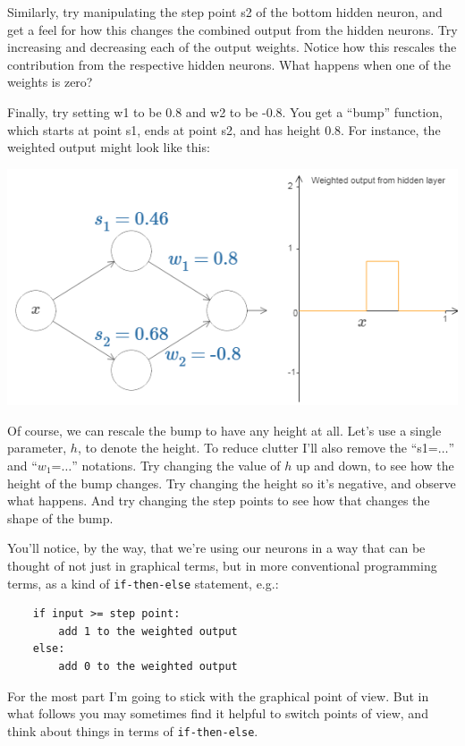 Similarly, try manipulating the step point s2 of the bottom hidden neuron, and get a feel for how this changes the combined output from the hidden neurons.
Try increasing and decreasing each of the output weights. Notice how this rescales the contribution from the respective hidden neurons. What happens when one of the weights is zero?

Finally, try setting w1 to be 0.8 and w2 to be -0.8. You get a ``bump'' function, which starts at point s1, ends at point s2, and has height 0.8.
 For instance, the weighted output might look like this:

{\centering \includegraphics[width=\textwidth,]{pic/wigglyfn14.png} \par}

Of course, we can rescale the bump to have any height at all. Let's use a single parameter, $h$, to denote the height. To reduce clutter I'll also remove the ``s1=$\ldots$'' and ``$w_1$=$\ldots$'' notations.
Try changing the value of $h$ up and down, to see how the height of the bump changes. Try changing the height so it's negative, and observe what happens. And try changing the step points to see how that changes the shape of the bump.

You'll notice, by the way, that we're using our neurons in a way that can be thought of not just in graphical terms, but in more conventional programming terms, as a kind of \lstinline{if-then-else} statement, e.g.:
\begin{lstlisting}
    if input >= step point:
        add 1 to the weighted output
    else:
        add 0 to the weighted output
\end{lstlisting}


For the most part I'm going to stick with the graphical point of view. But in what follows you may sometimes find it helpful to switch points of view, and think about things in terms of \lstinline{if-then-else}.


